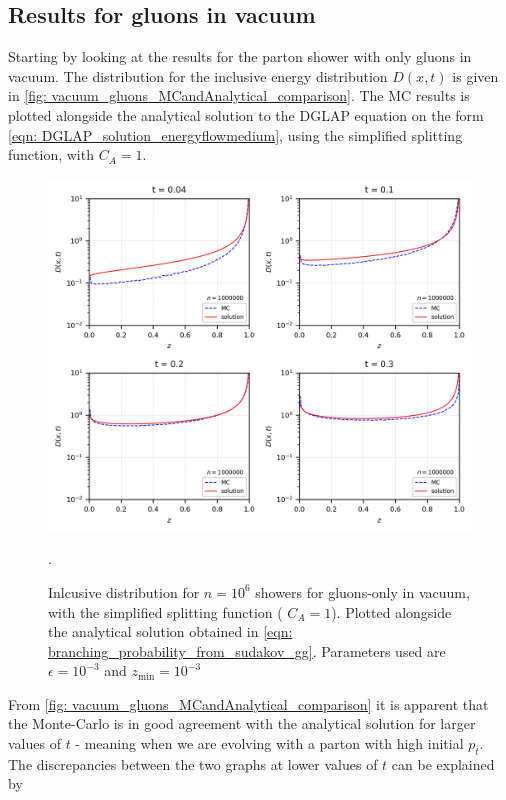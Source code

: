 \documentclass[main.tex]{subfiles}
\begin{document}
\subsection{Results for gluons in vacuum}
Starting by looking at the results for the parton shower with only gluons in vacuum. The distribution for the inclusive energy distribution \(D(x,t)\) is given in \autoref{fig: vacuum_gluons_MCandAnalytical_comparison}. The MC results is plotted alongside the analytical solution to the DGLAP equation on the form \autoref{eqn: DGLAP_solution_energyflowmedium}, using the simplified splitting function, with \(C_A=1\). 
\begin{figure}[htb]
    \centering
    \includegraphics[width=12cm]{pictures/plots/distributions/vacuum/vacuum_shower_analytical_1m.png}
    \caption{Inlcusive distribution for \(n=10^6\) showers for gluons-only in vacuum, with the simplified splitting function ( \(C_A=1\)). Plotted alongside the analytical solution obtained in \autoref{eqn: branching_probability_from_sudakov_gg}. Parameters used are \(\epsilon=10^{-3}\) and \(z_{\text{min}}=10^{-3}\)}. 
    \label{fig: vacuum_gluons_MCandAnalytical_comparison}
\end{figure}

From \autoref{fig: vacuum_gluons_MCandAnalytical_comparison} it is apparent that the Monte-Carlo is in good agreement with the analytical solution for larger values of \(t\) - meaning when we are evolving with a parton with high initial \(p_t\). The discrepancies between the two graphs at lower values of \(t\) can be explained by \elab
\end{document}
